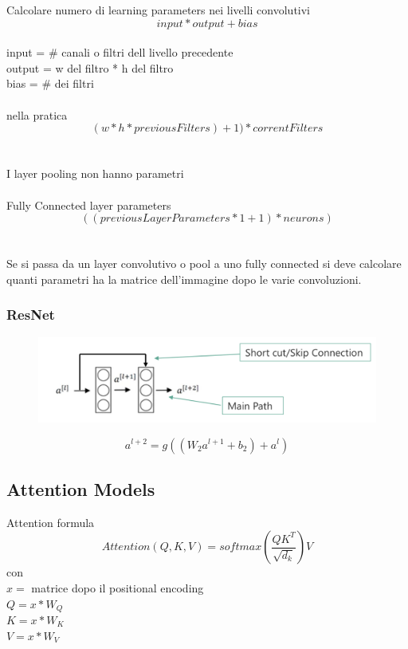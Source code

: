 \documentclass[]{article}
\begin{document}
Calcolare numero di learning parameters nei livelli convolutivi\\
\[ input * output + bias \] \\
input = \# canali o filtri dell livello precedente \\
output = w del filtro * h del filtro \\
bias = \# dei filtri \\ \\
nella pratica
\[(w*h*previousFilters)+1)*correntFilters \] \\ \\
I layer pooling non hanno parametri \\ \\
Fully Connected layer parameters \\
\[ ((previousLayerParameters * 1 + 1) * neurons) \] \\ \\
Se si passa da un layer convolutivo o pool a uno fully connected si deve calcolare quanti parametri ha la matrice dell'immagine dopo le varie convoluzioni. \\


\clearpage

\subsubsection{ResNet}
\begin{figure}[h] 
\centering 
\includegraphics[scale=0.5]{resnet} 
\end{figure} 
\[ a^{l+2} = g((W_2 a^{l+1} + b_2) + a^l)\]


\subsection{Attention Models}
Attention formula\\
\[ Attention(Q, K, V) = softmax(\frac{QK^T}{\sqrt{d_k}})V\]
con \\
$ x = $ matrice dopo il positional encoding \\
$ Q = x * W_Q $ \\
$ K = x * W_K $ \\
$ V = x * W_V $ \\ \\
\end{document}
